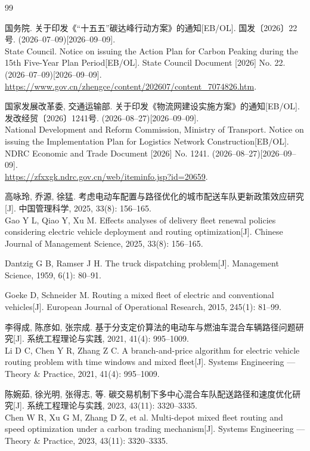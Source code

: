 \documentclass{setp-new}
\begin{document}
\begin{thebibliography}{99}
\begingroup
\renewcommand{\baselinestretch}{0.85}\selectfont

 国务院. 关于印发《“十五五”碳达峰行动方案》的通知\mbox{[EB/OL]}. 国发〔2026〕22号. (2026--07--09)[2026--09--09].\\
State Council. Notice on issuing the Action Plan for Carbon Peaking during the 15th Five-Year Plan Period\mbox{[EB/OL]}. State Council Document [2026] No. 22. (2026--07--09)[2026--09--09].\\
\url{https://www.gov.cn/zhengce/content/202607/content_7074826.htm}.

 国家发展改革委, 交通运输部. 关于印发《物流网建设实施方案》的通知\mbox{[EB/OL]}. 发改经贸〔2026〕1241号. (2026--08--27)[2026--09--09].\\
National Development and Reform Commission, Ministry of Transport. Notice on issuing the Implementation Plan for Logistics Network Construction\mbox{[EB/OL]}. NDRC Economic and Trade Document [2026] No. 1241. (2026--08--27)[2026--09--09].\\
\url{https://zfxxgk.ndrc.gov.cn/web/iteminfo.jsp?id=20659}.

 高咏玲, 乔源, 徐猛. 考虑电动车配置与路径优化的城市配送车队更新政策效应研究[J]. 中国管理科学, 2025, 33(8): 156--165.\\
Gao Y L, Qiao Y, Xu M. Effects analyses of delivery fleet renewal policies considering electric vehicle deployment and routing optimization[J]. Chinese Journal of Management Science, 2025, 33(8): 156--165.

 Dantzig G B, Ramser J H. The truck dispatching problem[J]. Management Science, 1959, 6(1): 80--91.

 Goeke D, Schneider M. Routing a mixed fleet of electric and conventional vehicles[J]. European Journal of Operational Research, 2015, 245(1): 81--99.

 李得成, 陈彦如, 张宗成. 基于分支定价算法的电动车与燃油车混合车辆路径问题研究[J]. 系统工程理论与实践, 2021, 41(4): 995--1009.\\
Li D C, Chen Y R, Zhang Z C. A branch-and-price algorithm for electric vehicle routing problem with time windows and mixed fleet[J]. Systems Engineering --- Theory \& Practice, 2021, 41(4): 995--1009.

 陈婉茹, 徐光明, 张得志, 等. 碳交易机制下多中心混合车队配送路径和速度优化研究[J]. 系统工程理论与实践, 2023, 43(11): 3320--3335.\\
Chen W R, Xu G M, Zhang D Z, et al. Multi-depot mixed fleet routing and speed optimization under a carbon trading mechanism[J]. Systems Engineering --- Theory \& Practice, 2023, 43(11): 3320--3335.


\end{thebibliography}
\end{document}
